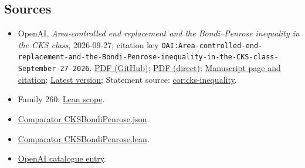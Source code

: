 \documentclass[11pt]{article}
\begin{document}
\subsection{Sources}
\begin{itemize}
\item OpenAI, \emph{Area-controlled end replacement and the Bondi–Penrose inequality in the CKS class}, 2026-09-27; citation key \texttt{OAI:Area-controlled-end-replacement-and-the-Bondi-Penrose-inequality-in-the-CKS-class-September-27-2026}. \href{https://github.com/openai/math/blob/adc7f1241b42e322a6451854ab7e4b4c146bf78a/preprints/Area-controlled-end-replacement-and-the-Bondi-Penrose-inequality-in-the-CKS-class-September-27-2026/paper.pdf}{PDF (GitHub)}; \href{https://github.com/openai/math/raw/adc7f1241b42e322a6451854ab7e4b4c146bf78a/preprints/Area-controlled-end-replacement-and-the-Bondi-Penrose-inequality-in-the-CKS-class-September-27-2026/paper.pdf}{PDF (direct)}; \href{https://github.com/openai/math/blob/adc7f1241b42e322a6451854ab7e4b4c146bf78a/preprints/Area-controlled-end-replacement-and-the-Bondi-Penrose-inequality-in-the-CKS-class-September-27-2026/README.md}{Manuscript page and citation}; \href{https://github.com/openai/math/blob/main/preprints/Area-controlled-end-replacement-and-the-Bondi-Penrose-inequality-in-the-CKS-class-September-27-2026/paper.pdf}{Latest version}; Statement source: \href{https://github.com/openai/math/blob/adc7f1241b42e322a6451854ab7e4b4c146bf78a/preprints/Area-controlled-end-replacement-and-the-Bondi-Penrose-inequality-in-the-CKS-class-September-27-2026/build/sections/00-introduction.tex\#L154}{cor:cks-inequality}.
\item Family 260: \href{https://github.com/openai/math/blob/adc7f1241b42e322a6451854ab7e4b4c146bf78a/lean/docs/260.md}{Lean scope}.
\item \href{https://github.com/openai/math/blob/adc7f1241b42e322a6451854ab7e4b4c146bf78a/lean/ComparatorChallenges/CKSBondiPenrose.json}{Comparator CKSBondiPenrose.json}.
\item \href{https://github.com/openai/math/blob/adc7f1241b42e322a6451854ab7e4b4c146bf78a/lean/ComparatorChallenges/CKSBondiPenrose.lean}{Comparator CKSBondiPenrose.lean}.
\item \href{https://github.com/openai/math/blob/adc7f1241b42e322a6451854ab7e4b4c146bf78a/CONTENTS.md}{OpenAI catalogue entry}.
\end{itemize}
\end{document}
